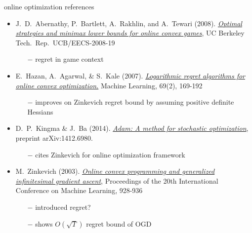 \documentclass[xcolor={svgnames},
               hyperref={colorlinks,citecolor=DeepPink4,linkcolor=FireBrick,urlcolor=Maroon}]
               {beamer}
\begin{document}
\begin{frame}{online optimization references}

\begin{itemize}
\footnotesize
\item J.~D.~Abernathy, P.~Bartlett, A.~Rakhlin, and A.~Tewari (2008). \href{https://www2.eecs.berkeley.edu/Pubs/TechRpts/2008/EECS-2008-19.pdf}{\emph{Optimal strategies and minimax lower bounds for online convex games}}, UC Berkeley Tech.~Rep.~UCB/EECS-2008-19
    \begin{itemize}
    \scriptsize
    \item[$-$] regret in game context
    \end{itemize}
\item E.~Hazan, A.~Agarwal, \& S.~Kale (2007).  \href{https://link.springer.com/content/pdf/10.1007/s10994-007-5016-8.pdf}{\emph{Logarithmic regret algorithms for online convex optimization.}} Machine Learning, 69(2), 169-192
    \begin{itemize}
    \scriptsize
    \item[$-$] improves on Zinkevich regret bound by assuming positive definite Hessians
    \end{itemize}
\item D.~P.~Kingma \& J.~Ba (2014). \href{https://arxiv.org/abs/1412.6980}{\emph{Adam: A method for stochastic optimization}}, preprint arXiv:1412.6980.
    \begin{itemize}
    \scriptsize
    \item[$-$] cites Zinkevich for online optimization framework
    \end{itemize}
\item M.~Zinkevich (2003). \href{https://www.aaai.org/Papers/ICML/2003/ICML03-120.pdf}{\emph{Online convex programming and generalized infinitesimal gradient ascent}}, Proceedings of the 20th International Conference on Machine Learning, 928-936
    \begin{itemize}
    \scriptsize
    \item[$-$] introduced regret?
    \item[$-$] shows $O(\sqrt{T})$ regret bound of OGD
    \end{itemize}
\end{itemize}
\end{frame}
\end{document}
